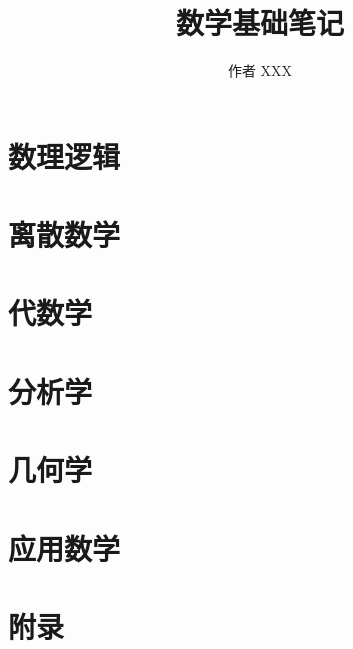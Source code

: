 



\makeindex
\title{数学基础笔记}
\author{作者 XXX}


\frontmatter



\tableofcontents

\mainmatter
\part{数理逻辑}


\part{离散数学}
% 

\part{代数学}

\part{分析学}

\part{几何学}

\part{应用数学}

\part{附录}
\appendix




\backmatter

\printindex

